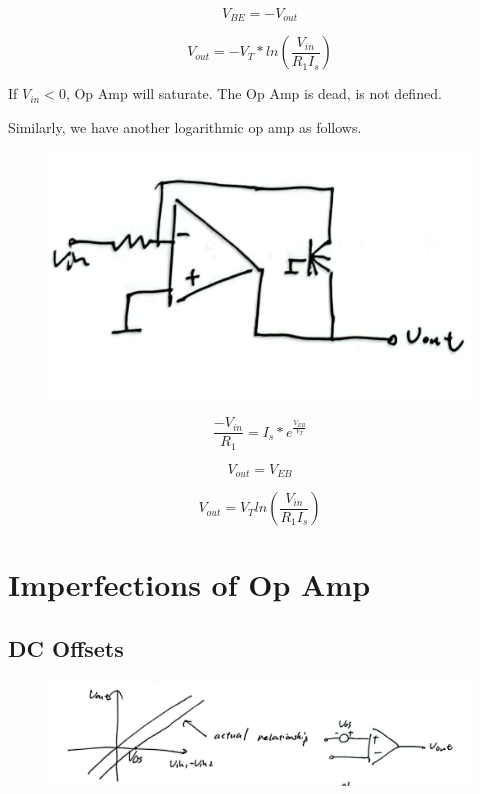\documentclass[fontset=windows]{article}
\begin{document}
$$V_{BE}=-V_{out}$$

$$V_{out}=-V_T*ln(\frac{V_{in}}{R_1I_s})$$

If $V_{in}<0$, Op Amp will saturate. The Op Amp is dead, is not defined. 

Similarly, we have another logarithmic op amp as follows. 

\begin{figure}[htbp]
    \centering
    \includegraphics[scale=0.8]{5.jpg}
    \captionsetup{labelformat=empty}
    \caption{}
    \label{5}
\end{figure}

$$\frac{-V_{in}}{R_1}=I_s*e^{\frac{V_{EB}}{V_T}}$$

$$V_{out}=V_{EB}$$

$$V_{out}=V_T ln(\frac{V_{in}}{R_1I_s})$$

\section*{Imperfections of Op Amp}

\subsection*{DC Offsets}

\begin{figure}[htbp]
    \centering
    \includegraphics[scale=0.6]{6.jpg}
    \captionsetup{labelformat=empty}
    \caption{}
    \label{6}
\end{figure}
\end{document}
